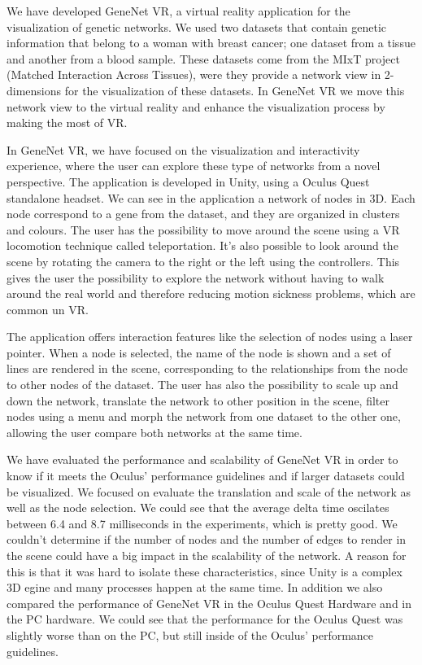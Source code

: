 We have developed GeneNet VR, a virtual reality application for the visualization of genetic networks. We used two datasets that contain genetic information that belong to a woman with breast cancer; one dataset from a tissue and another from a blood sample. These datasets come from the MIxT project (Matched Interaction Across Tissues), were they provide a network view in 2-dimensions for the visualization of these datasets. In GeneNet VR we move this network view to the virtual reality and enhance the visualization process by making the most of VR.

In GeneNet VR, we have focused on the visualization and interactivity experience, where the user can explore these type of networks from a novel perspective. The application is developed in Unity, using a Oculus Quest standalone headset.
We can see in the application a network of nodes in 3D. Each node correspond to a gene from the dataset, and they are organized in clusters and colours. The user has the possibility to move around the scene using a VR locomotion technique called teleportation. It's also possible to look around the scene by rotating the camera to the right or the left using the controllers. This gives the user the possibility to explore the network without having to walk around the real world and therefore reducing motion sickness problems, which are common un VR.

The application offers interaction features like the selection of nodes using a laser pointer. When a node is selected, the name of the node is shown and a set of lines are rendered in the scene, corresponding to the relationships from the node to other nodes of the dataset. The user has also the possibility to scale up and down the network, translate the network to other position in the scene, filter nodes using a menu and morph the network from one dataset to the other one, allowing the user compare both networks at the same time.

We have evaluated the performance and scalability of GeneNet VR in order to know if it meets the Oculus' performance guidelines and if larger datasets could be visualized. We focused on evaluate the translation and scale of the network as well as the node selection.  We could see that the average delta time oscilates between 6.4 and 8.7 milliseconds in the experiments, which is pretty good. We couldn't determine if the number of nodes and the number of edges to render in the scene could have a big impact in the scalability of the network. A reason for this is that it was hard to isolate these characteristics, since Unity is a complex 3D egine and many processes happen at the same time. In addition we also compared the performance of GeneNet VR in the Oculus Quest Hardware and in the PC hardware. We could see that the performance for the Oculus Quest was slightly worse than on the PC, but still inside of the Oculus' performance guidelines.


